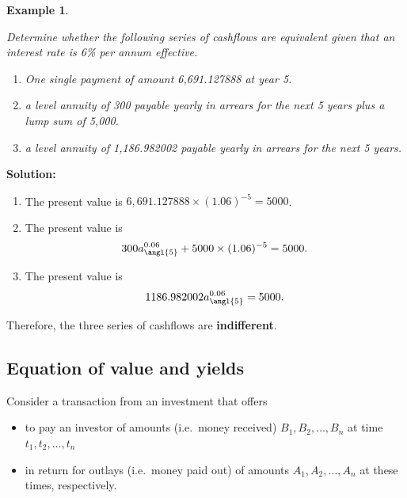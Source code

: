 \documentclass[
]{book}
\theoremstyle{definition}
\theoremstyle{definition}
\newtheorem{example}{Example}[chapter]
\theoremstyle{definition}
\theoremstyle{definition}
\theoremstyle{remark}
\begin{document}
\begin{example}
\protect\hypertarget{exm:unlabeled-div-45}{}\label{exm:unlabeled-div-45}

\emph{Determine whether the following series of cashflows are equivalent
given that an interest rate is 6\% per annum effective.}

\begin{enumerate}
\def\labelenumi{\arabic{enumi}.}
\item
  \emph{One single payment of amount 6,691.127888 at year 5.}
\item
  \emph{a level annuity of 300 payable yearly in arrears for the next 5
  years plus a lump sum of 5,000.}
\item
  \emph{a level annuity of 1,186.982002 payable yearly in arrears for the
  next 5 years.}
\end{enumerate}

\end{example}

\textbf{Solution:}

\begin{enumerate}
\def\labelenumi{\arabic{enumi}.}
\item
  The present value is \(6,691.127888 \times (1.06)^{-5} = 5000\).
\item
  The present value is
  \[300 a^{0.06}_{\angl{5}}   + 5000 \times (1.06)^{-5}  = 5000.\]
\item
  The present value is \[1186.982002 a^{0.06}_{\angl{5}}     = 5000.\]
\end{enumerate}

Therefore, the three series of cashflows are \textbf{indifferent}.

\hypertarget{equation-of-value-and-yields}{%
\subsection{Equation of value and yields}\label{equation-of-value-and-yields}}

Consider a transaction from an investment that offers

\begin{itemize}
\item
  to pay an investor of amounts (i.e.~money received)
  \(B_1, B_2, \ldots, B_n\) at time \(t_1, t_2, \ldots ,t_n\)
\item
  in return for outlays (i.e.~money paid out) of amounts
  \(A_1, A_2, \ldots, A_n\) at these times, respectively.
\end{itemize}
\end{document}
